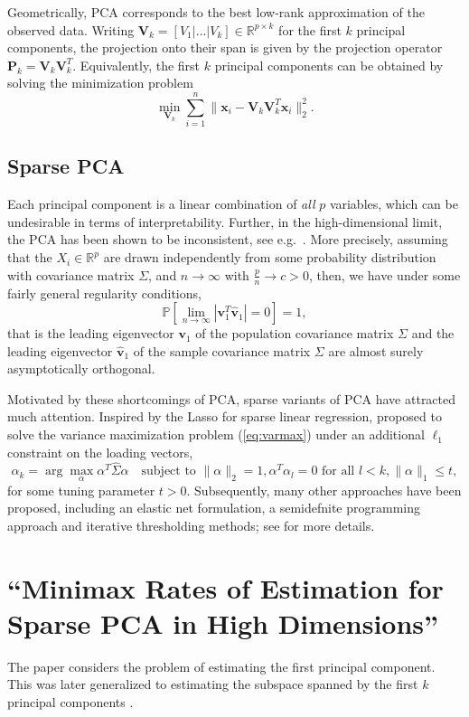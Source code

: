\documentclass[11pt]{article}
\newcommand{\R}{\mathbb{R}}
\newcommand{\x}{\mathbf{x}}
\newcommand{\V}{\mathbf{V}}
\renewcommand{\P}{\mathbb{P}}
\begin{document}
Geometrically, PCA corresponds to the best low-rank approximation of the observed data. Writing $\V_k = [V_1|\dots|V_k]\in \R^{p\times k}$ for the first $k$ principal components, the projection onto their span is given by the projection operator $\mathbf{P}_k = \V_k\V_k^T$. Equivalently, the first $k$ principal components can be obtained by solving the minimization problem
\begin{equation*}
\min_{\V_k}\sum_{i=1}^n\|\x_i - \V_k\V_k^T\x_i\|_2^2.
\end{equation*}

\subsection{Sparse PCA}
Each principal component is a linear combination of \emph{all} $p$ variables, which can be undesirable in terms of interpretability. Further, in the high-dimensional limit, the PCA has been shown to be inconsistent, see e.g.\ \citep{BS06}. More precisely, assuming that the $X_i\in\R^p$ are drawn independently from some probability distribution with covariance matrix $\Sigma$, and $n\rightarrow \infty$ with $\frac{p}{n}\rightarrow c>0$, then, we have under some fairly general regularity conditions,
\begin{equation*}
\P[\lim_{n\rightarrow \infty}|\mathbf{v}_1^T\hat{\mathbf{v}}_1|=0]=1,
\end{equation*}   
that is the leading eigenvector $\mathbf{v}_1$ of the population covariance matrix $\Sigma$ and the leading eigenvector $\hat{\mathbf{v}}_1$ of the sample covariance matrix $\Sigma$ are almost surely asymptotically orthogonal. 

Motivated by these shortcomings of PCA, sparse variants of PCA have attracted much attention. 
Inspired by the Lasso for sparse linear regression, \cite{JTU03} proposed to solve the variance maximization problem (\ref{eq:varmax}) under an additional $\ell_1$ constraint on the loading vectors,
\begin{equation*}
\alpha_k = \operatorname{arg}\max_\alpha\alpha^T\hat{\Sigma}\alpha \quad \text{subject to } \|\alpha\|_2=1, \alpha^T\alpha_l = 0 \text{ for all } l<k, \|\alpha\|_1\le t,
\end{equation*}
for some tuning parameter $t>0$. Subsequently, many other approaches have been proposed, including an elastic net formulation, a semidefnite programming approach and iterative thresholding methods; see \citep{ZX18} for more details.

\section{``Minimax Rates of Estimation for Sparse PCA in High Dimensions''}
The paper \citep{VL12} considers the problem of estimating the first principal component. This was later generalized to estimating the subspace spanned by the first $k$ principal components \citep{VL13}.
\end{document}
